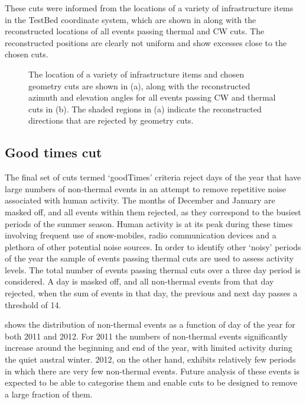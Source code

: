These cuts were informed from the locations of a variety of infrastructure items in the TestBed coordinate system, which are shown in  along with the reconstructed locations of all events passing thermal and CW cuts. The reconstructed positions are clearly not uniform and show excesses close to the chosen cuts.

\begin{figure}[htpb]
  \hfill
  \caption{The location of a variety of infrastructure items and chosen geometry cuts are shown in (a), along with the reconstructed azimuth and elevation angles for all events passing CW and thermal cuts in (b). The shaded regions in (a) indicate the reconstructed directions that are rejected by geometry cuts.}
  \label{fig:Analysis:Anthropogenic-Cuts:Geometry-Cuts:VPol-Reco}
\end{figure}

\subsection{Good times cut}
\label{sec:Analysis:Anthropogenic-Cuts:Good-Times}
The final set of cuts termed `goodTimes' criteria reject days of the year that have large numbers of non-thermal events in an attempt to remove repetitive noise associated with human activity. The months of December and January are masked off, and all events within them rejected, as they correspond to the busiest periods of the summer season. Human activity is at its peak during these times involving frequent use of snow-mobiles, radio communication devices and a plethora of other potential noise sources. In order to identify other `noisy' periods of the year the sample of events passing thermal cuts are used to assess activity levels. The total number of events passing thermal cuts over a three day period is considered. A day is masked off, and all non-thermal events from that day rejected, when the sum of events in that day, the previous and next day passes a threshold of 14. 

 shows the distribution of non-thermal events as a function of day of the year for both 2011 and 2012. For 2011 the numbers of non-thermal events significantly increase around the beginning and end of the year, with limited activity during the quiet austral winter. 2012, on the other hand, exhibits relatively few periods in which there are very few non-thermal events. Future analysis of these events is expected to be able to categorise them and enable cuts to be designed to remove a large fraction of them.

